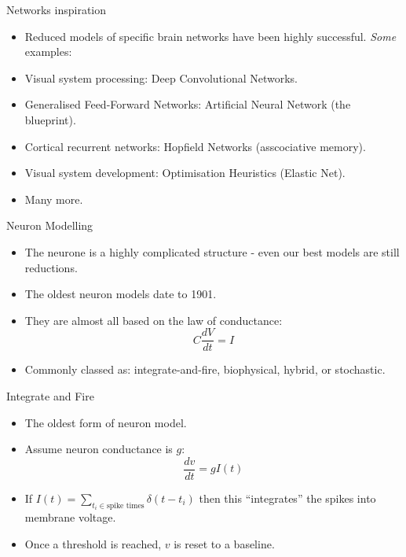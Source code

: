 \documentclass[
  ignorenonframetext,
]{beamer}
\begin{document}
\begin{frame}{Networks inspiration}
\protect\hypertarget{networks-inspiration}{}
\begin{itemize}
\item
  Reduced models of specific brain networks have been highly successful.
  \emph{Some} examples:
\item
  Visual system processing: Deep Convolutional Networks.
\item
  Generalised Feed-Forward Networks: Artificial Neural Network (the
  blueprint).
\item
  Cortical recurrent networks: Hopfield Networks (asscociative memory).
\item
  Visual system development: Optimisation Heuristics (Elastic Net).
\item
  Many more.
\end{itemize}
\end{frame}

\begin{frame}{Neuron Modelling}
\protect\hypertarget{neuron-modelling}{}
\begin{itemize}
\item
  The neurone is a highly complicated structure - even our best models
  are still reductions.
\item
  The oldest neuron models date to 1901.
\item
  They are almost all based on the law of conductance:
  \[ C\frac{dV}{dt} = I \]
\item
  Commonly classed as: integrate-and-fire, biophysical, hybrid, or
  stochastic.
\end{itemize}
\end{frame}

\begin{frame}{Integrate and Fire}
\protect\hypertarget{integrate-and-fire}{}
\begin{itemize}
\item
  The oldest form of neuron model.
\item
  Assume neuron conductance is \(g\): \[\frac{dv}{dt} = g I(t)\]
\item
  If \(I(t) = \sum_{t_i\in\text{spike times}} \delta(t - t_i)\) then
  this ``integrates'' the spikes into membrane voltage.
\item
  Once a threshold is reached, \(v\) is reset to a baseline.
\end{itemize}
\end{frame}
\end{document}
